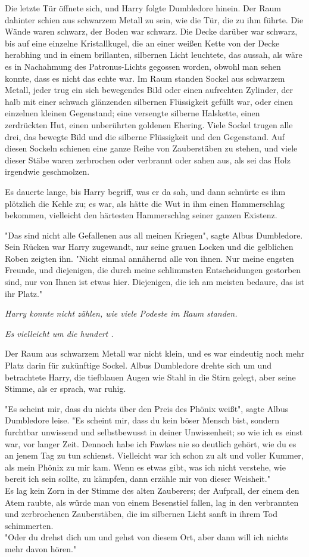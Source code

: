 {Die letzte Tür öffnete sich, und Harry folgte Dumbledore hinein. Der Raum dahinter schien aus schwarzem Metall zu sein, wie die Tür, die zu ihm führte. Die Wände waren schwarz, der Boden war schwarz. Die Decke darüber war schwarz, bis auf eine einzelne Kristallkugel, die an einer weißen Kette von der Decke herabhing und in einem brillanten, silbernen Licht leuchtete, das aussah, als wäre es in Nachahmung des Patronus-Lichts gegossen worden, obwohl man sehen konnte, dass es nicht das echte war. Im Raum standen Sockel aus schwarzem Metall, jeder trug ein sich bewegendes Bild oder einen aufrechten Zylinder, der halb mit einer schwach glänzenden silbernen Flüssigkeit gefüllt war, oder einen einzelnen kleinen Gegenstand; eine versengte silberne Halskette, einen zerdrückten Hut, einen unberührten goldenen Ehering. Viele Sockel trugen alle drei, das bewegte Bild und die silberne Flüssigkeit und den Gegenstand. Auf diesen Sockeln schienen eine ganze Reihe von Zauberstäben zu stehen, und viele dieser Stäbe waren zerbrochen oder verbrannt oder sahen aus, als sei das Holz irgendwie geschmolzen.

Es dauerte lange, bis Harry begriff, was er da sah, und dann schnürte es ihm plötzlich die Kehle zu; es war, als hätte die Wut in ihm einen Hammerschlag bekommen, vielleicht den härtesten Hammerschlag seiner ganzen Existenz.

"Das sind nicht alle Gefallenen aus all meinen Kriegen", sagte Albus Dumbledore. Sein Rücken war Harry zugewandt, nur seine grauen Locken und die gelblichen Roben zeigten ihn. "Nicht einmal annähernd alle von ihnen. Nur meine engsten Freunde, und diejenigen, die durch meine schlimmsten Entscheidungen gestorben sind, nur von Ihnen ist etwas hier. Diejenigen, die ich am meisten bedaure, das ist ihr Platz."

\emph{Harry konnte nicht zählen, wie viele Podeste im Raum standen.}

\emph{Es vielleicht um die hundert .}

Der Raum aus schwarzem Metall war nicht klein, und es war eindeutig noch mehr Platz darin für zukünftige Sockel. Albus Dumbledore drehte sich um und betrachtete Harry, die tiefblauen Augen wie Stahl in die Stirn gelegt, aber seine Stimme, als er sprach, war ruhig.

"Es scheint mir, dass du nichts über den Preis des Phönix weißt", sagte Albus Dumbledore leise. "Es scheint mir, dass du kein böser Mensch bist, sondern furchtbar unwissend und selbstbewusst in deiner Unwissenheit; so wie ich es einst war, vor langer Zeit. Dennoch habe ich Fawkes nie so deutlich gehört, wie du es an jenem Tag zu tun schienst. Vielleicht war ich schon zu alt und voller Kummer, als mein Phönix zu mir kam. Wenn es etwas gibt, was ich nicht verstehe, wie bereit ich sein sollte, zu kämpfen, dann erzähle mir von dieser Weisheit."\\ Es lag kein Zorn in der Stimme des alten Zauberers; der Aufprall, der einem den Atem raubte, als würde man von einem Besenstiel fallen, lag in den verbrannten und zerbrochenen Zauberstäben, die im silbernen Licht sanft in ihrem Tod schimmerten.\\ "Oder du drehst dich um und gehst von diesem Ort, aber dann will ich nichts mehr davon hören."

}

